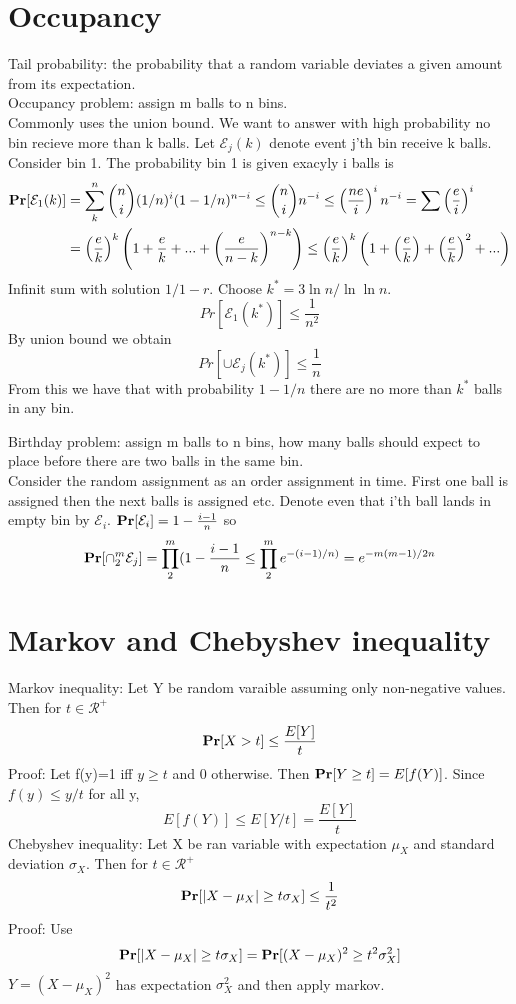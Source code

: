 \documentclass[a4paper]{article}
\def\Pr{\mbox{\textbf{Pr}}}
\begin{document}
\section{Occupancy}
Tail probability: the probability that a random variable deviates a given amount from its expectation.\\
Occupancy problem: assign m balls to n bins.\\
Commonly uses the union bound. We want to answer with high probability no bin recieve more than k balls.
Let \(\mathcal{E}_j(k)\) denote event j'th bin receive k balls. Consider bin 1. The probability bin 1 is given exacyly i balls is
\begin{align}
\Pr[\mathcal{E}_1(k)] &= \sum_k^n {n \choose i} (1/n)^i (1-1/n)^{n-i} \leq {n \choose i} n^{-i} \leq \left(\frac{ne}{i}\right)^in^{-i} = \sum \left(\frac{e}{i}\right)^i\\
&= \left(\frac{e}{k}\right)^k\left(1+\frac{e}{k}+...+\left(\frac{e}{n-k}\right)^{n-k}\right) \leq \left(\frac{e}{k}\right)^k\left(1+\left(\frac{e}{k}\right)+\left(\frac{e}{k}\right)^2+...\right)
\end{align}
Infinit sum with solution \(1/1-r\). Choose \(k^* = 3\ln n/\ln\ln n\).
\[Pr[\mathcal{E}_1(k^*)] \leq \frac{1}{n^2}\]
By union bound we obtain
\[Pr[\cup\mathcal{E}_j(k^*)] \leq \frac{1}{n}\]
From this we have that with probability \(1-1/n\) there are no more than \(k^*\) balls in any bin.

Birthday problem: assign m balls to n bins, how many balls should expect to place before there are two balls in the same bin.\\
Consider the random assignment as an order assignment in time. First one ball is assigned then the next balls is assigned etc. Denote even that i'th ball lands in empty bin by \(\mathcal{E}_i\).  \(\Pr[\mathcal{E}_i]= 1 - \frac{i-1}{n}\) so
\[\Pr[\cap_2^m\mathcal{E}_j] = \prod_2^m(1-\frac{i-1}{n} \leq \prod_2^me^{-(i-1)/n)}=e^{-m(m-1)/2n}\]
\section{Markov and Chebyshev inequality}
Markov inequality: Let Y be random varaible assuming only non-negative values. Then for \(t \in \mathcal{R}^+\) \[\Pr[X > t] \leq \frac{E[Y]}{t}\]
Proof: Let f(y)=1 iff \(y \geq t\) and 0 otherwise.  Then \(\Pr[Y\geq t] = E[f(Y)]\). Since \(f(y)\leq y/t\) for all y,
\[E[f(Y)] \leq E[Y/t] = \frac{E[Y]}{t}\]
Chebyshev inequality: Let X be ran variable with expectation \(\mu_X\) and standard deviation \(\sigma_X\). Then for \(t \in \mathcal{R}^+\)
\[\Pr[|X-\mu_X| \geq t\sigma_X] \leq \frac{1}{t^2}\]
Proof: Use
\[\Pr[|X-\mu_X| \geq t\sigma_X] = \Pr[(X-\mu_X)^2 \geq t^2\sigma^2_X]\]
\(Y=(X-\mu_X)^2\) has expectation \(\sigma^2_X\) and then apply markov.
\end{document}
